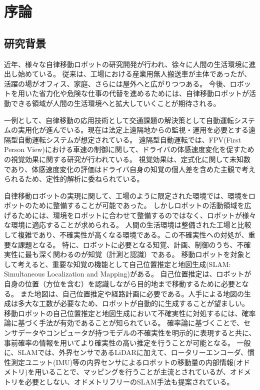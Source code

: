 \chapter{序論}
\section{研究背景}

近年、様々な自律移動ロボットの研究開発が行われ、徐々に人間の生活環境に進出し始めている。
従来は、工場における産業用無人搬送車が主体であったが、活躍の場がオフィス、家庭、さらには屋外へと広がりつつある。
今後、ロボットを用いた省力化や危険な仕事の代替を進めるためには、自律移動ロボットが活動できる領域が人間の生活環境へと拡大していくことが期待される。

一例として、自律移動の応用技術として交通課題の解決策として自動運転システムの実用化が進んでいる。現在は法定上遠隔地からの監視・運用を必要とする遠隔型自動運転システムが想定されている。
遠隔型自動運転では、FPV(First Person View)における車速の制御に関して、ドライバの体感速度変化を促すための視覚効果に関する研究が行われている。
視覚効果は、定式化に関して未知数であり、体感速度変化の評価はドライバ自身の知覚の個人差を含めた主観で考えられるため、定性的解析に委ねられている。

自律移動ロボットの実現に関して、工場のように限定された環境では、環境をロボットのために整備することが可能であった。
しかしロボットの活動領域を広げるためには、環境をロボットに合わせて整備するのではなく、ロボットが様々な環境に適応することが求められる。
人間の生活環境は整備された工場と比較して複雑であり、不確実性が高くなる環境である。この不確実性への対処が、重要な課題となる。
特に、ロボットに必要となる知覚、計画、制御のうち、不確実性に最も深く関わるのが知覚（計測と認識）である。
移動ロボットを対象として考えると、重要な知覚の機能として自己位置推定と地図生成(SLAM: Simultaneous Localization and Mapping)がある。
自己位置推定は、ロボットが自身の位置（方位を含む）を認識しながら目的地まで移動するために必要となる。
また地図は、自己位置推定や経路計画に必要である。人手による地図の生成は多大な工数が必要なため、ロボットが自動的に生成することが望ましい。
移動ロボットの自己位置推定と地図生成において不確実性に対処するには、確率論に基づく手法が有効であることが知られている。
確率論に基づくことで、センサデータやコンピュータが持つモデルの不確実性を明示的に表現すると共に、事前確率の情報を用いてより確実性の高い推定を行うことが可能となる。
一般に、SLAMでは、外界センサであるLiDARに加えて、ロータリーエンコーダ、慣性測定ユニット(IMU)等の内界センサによるロボットの移動量の内部情報(オドメトリ)を用いることで、マッピングを行うことが主流とされているが、オドメトリを必要としない、オドメトリフリーのSLAM手法も提案されている。

